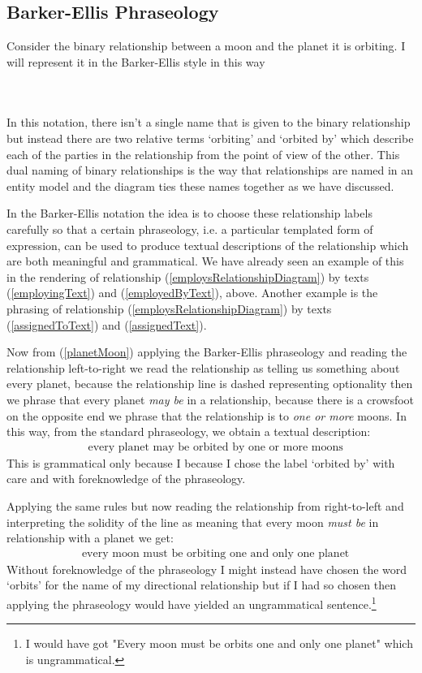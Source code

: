 \subsection{Barker-Ellis Phraseology} 
\mynote 
Consider the binary relationship between a moon and the planet it is orbiting. 
I will represent it in the  Barker-Ellis style in this way
\begin{gather}
\label{planetMoon}
\raisebox{-0.65cm}{

}
\end{gather}
In this notation, there isn't a single name that is given to
 the binary relationship but instead there are two relative terms `orbiting' and `orbited by' which describe each of the parties in the relationship from the point of view of the other. This dual naming of binary relationships is the way that relationships are named in an entity model and the diagram ties these names together as we have discussed.

\mynote
In the Barker-Ellis notation the idea 
is to choose these relationship labels
carefully so that a certain phraseology, i.e. a particular templated form of expression,
can be used to produce textual descriptions of the relationship which are both meaningful and grammatical.
We have already seen an example of this in the rendering of
relationship (\ref{employsRelationshipDiagram}) by texts 
(\ref{employingText}) and (\ref{employedByText}), above. 
Another example is the phrasing of relationship (\ref{employsRelationshipDiagram})
by texts (\ref{assignedToText}) and (\ref{assignedText}).  

Now from (\ref{planetMoon}) applying the Barker-Ellis  phraseology and reading the 
relationship left-to-right we read the relationship as telling us something about every planet, because the relationship line is dashed representing optionality then we phrase that every planet \textit{may be} 
in a relationship,
because there is a crowsfoot on the opposite end we phrase that the relationship is to 
\textit{one or more} moons.  In this way, from the standard phraseology, we obtain a textual description:
\begin{align}
&\mbox{every planet may be orbited by one or more moons} 
\end{align}
This is grammatical only because I 
because I chose the label `orbited by' with care and with foreknowledge of the  phraseology.
 
Applying the same rules but now reading  the relationship from right-to-left and interpreting the solidity of the line as 
 meaning that every moon \textit{must be} in relationship with a planet we get:
\begin{align}
&\mbox{every moon must be orbiting  one and only one planet} 
\end{align}
Without foreknowledge of the phraseology I might instead have chosen the word `orbits' for the name of my directional relationship but if I had so chosen then applying the phraseology would have yielded an ungrammatical sentence.\footnote{I would have got "Every moon must be orbits one and only one planet" which is ungrammatical.}
